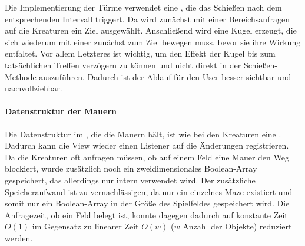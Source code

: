 Die Implementierung der Türme verwendet eine , die das Schießen nach dem entsprechenden Intervall triggert. Da wird zunächst mit einer Bereichsanfragen auf die Kreaturen ein Ziel ausgewählt. Anschließend wird eine Kugel erzeugt, die sich wiederum mit einer  zunächst zum Ziel bewegen muss, bevor sie ihre Wirkung entfaltet. Vor allem Letzteres ist wichtig, um den Effekt der Kugel bis zum tatsächlichen Treffen verzögern zu können und nicht direkt in der Schießen-Methode auszuführen. Dadurch ist der Ablauf für den User besser sichtbar und nachvollziehbar.


\paragraph{Datenstruktur der Mauern} Die Datenstruktur im , die die Mauern hält, ist wie bei den Kreaturen eine . Dadurch kann die View wieder einen Listener auf die Änderungen registrieren. Da die Kreaturen oft anfragen müssen, ob auf einem Feld eine Mauer den Weg blockiert, wurde zusätzlich noch ein zweidimensionales Boolean-Array gespeichert, das allerdings nur intern verwendet wird. Der zusätzliche Speicheraufwand ist zu vernachlässigen, da nur ein einzelnes Maze existiert und somit nur ein Boolean-Array in der Größe des Spielfeldes gespeichert wird. Die Anfragezeit, ob ein Feld belegt ist, konnte dagegen dadurch auf konstante Zeit \(O(1)\) im Gegensatz zu linearer Zeit \(O(w)\) (\(w\) Anzahl der  Objekte) reduziert werden. 

